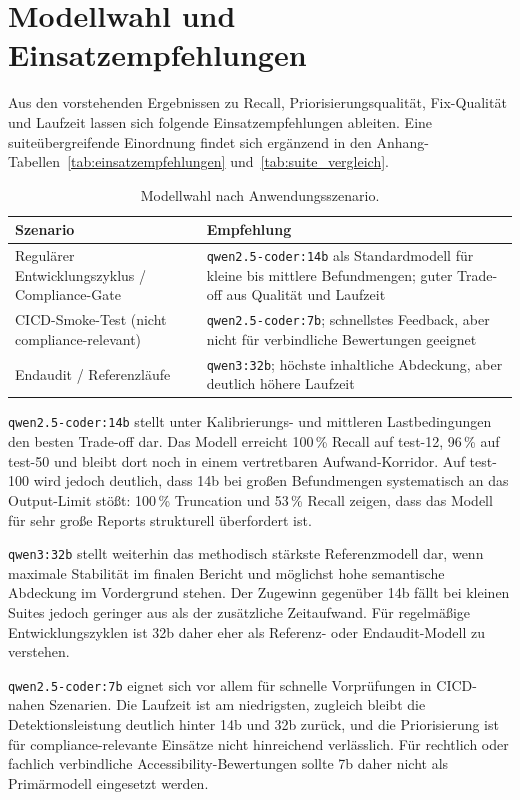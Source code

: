 \section{Modellwahl und Einsatzempfehlungen}
\label{sec:modellwahl}

Aus den vorstehenden Ergebnissen zu Recall, Priorisierungsqualität, Fix-Qualität und Laufzeit lassen sich folgende Einsatzempfehlungen ableiten. Eine suiteübergreifende Einordnung findet sich ergänzend in den Anhang-Tabellen~\ref{tab:einsatzempfehlungen} und~\ref{tab:suite_vergleich}.

\begin{table}[htbp]
\centering
\small
\renewcommand{\arraystretch}{1.15}
\begin{tabular}{@{}lp{8cm}@{}}
\toprule
\textbf{Szenario} & \textbf{Empfehlung} \\
\midrule
Regulärer Entwicklungszyklus / Compliance-Gate & \texttt{qwen2.5-coder:14b} als Standardmodell für kleine bis mittlere Befundmengen; guter Trade-off aus Qualität und Laufzeit \\
\ac{CICD}-Smoke-Test (nicht compliance-relevant) & \texttt{qwen2.5-coder:7b}; schnellstes Feedback, aber nicht für verbindliche Bewertungen geeignet \\
Endaudit / Referenzläufe & \texttt{qwen3:32b}; höchste inhaltliche Abdeckung, aber deutlich höhere Laufzeit \\
\bottomrule
\end{tabular}
\caption{Modellwahl nach Anwendungsszenario.}
\label{tab:modellwahl}
\end{table}

\texttt{qwen2.5-coder:14b} stellt unter Kalibrierungs- und mittleren Lastbedingungen den besten Trade-off dar. Das Modell erreicht 100\,\% Recall auf test-12, 96\,\% auf test-50 und bleibt dort noch in einem vertretbaren Aufwand-Korridor. Auf test-100 wird jedoch deutlich, dass 14b bei großen Befundmengen systematisch an das Output-Limit stößt: 100\,\% Truncation und 53\,\% Recall zeigen, dass das Modell für sehr große Reports strukturell überfordert ist.

\texttt{qwen3:32b} stellt weiterhin das methodisch stärkste Referenzmodell dar, wenn maximale Stabilität im finalen Bericht und möglichst hohe semantische Abdeckung im Vordergrund stehen. Der Zugewinn gegenüber 14b fällt bei kleinen Suites jedoch geringer aus als der zusätzliche Zeitaufwand. Für regelmäßige Entwicklungszyklen ist 32b daher eher als Referenz- oder Endaudit-Modell zu verstehen.

\texttt{qwen2.5-coder:7b} eignet sich vor allem für schnelle Vorprüfungen in \ac{CICD}-nahen Szenarien. Die Laufzeit ist am niedrigsten, zugleich bleibt die Detektionsleistung deutlich hinter 14b und 32b zurück, und die Priorisierung ist für compliance-relevante Einsätze nicht hinreichend verlässlich. Für rechtlich oder fachlich verbindliche Accessibility-Bewertungen sollte 7b daher nicht als Primärmodell eingesetzt werden.